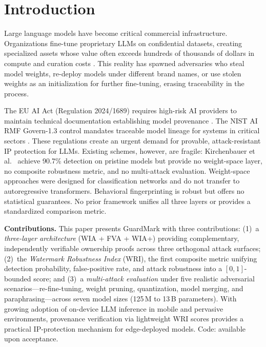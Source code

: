 \documentclass[conference]{IEEEtran}
\begin{document}
\section{Introduction}
\label{sec:intro}

Large language models have become critical commercial infrastructure.
Organizations fine-tune proprietary LLMs on confidential datasets, creating
specialized assets whose value often exceeds hundreds of thousands of dollars
in compute and curation costs \cite{brown2020language,ouyang2022training}.
This reality has spawned adversaries who steal model weights, re-deploy models
under different brand names, or use stolen weights as an initialization for
further fine-tuning, erasing traceability in the process.

The EU AI Act (Regulation 2024/1689) requires high-risk AI providers to
maintain technical documentation establishing model provenance
\cite{eu2024aiact}. The NIST AI RMF Govern-1.3 control mandates traceable
model lineage for systems in critical sectors \cite{nist2023ai}.
These regulations create an urgent demand for provable, attack-resistant IP
protection for LLMs. Existing schemes, however, are fragile: Kirchenbauer
et al.~\cite{kirchenbauer2023watermark} achieve 90.7\% detection on pristine
models but provide no weight-space layer, no composite robustness metric, and
no multi-attack evaluation. Weight-space approaches
\cite{uchida2017embedding,zhang2018protecting} were designed for classification
networks and do not transfer to autoregressive transformers. Behavioral
fingerprinting \cite{cao2021ipguard} is robust but offers no statistical
guarantees. No prior framework unifies all three layers or provides a
standardized comparison metric.

\textbf{Contributions.} This paper presents GuardMark with three contributions:
(1)~a \emph{three-layer architecture} (WIA + FVA + WIA+) providing
complementary, independently verifiable ownership proofs across three
orthogonal attack surfaces;
(2)~the \emph{Watermark Robustness Index} (WRI), the first composite metric
unifying detection probability, false-positive rate, and attack robustness
into a $[0,1]$-bounded score; and
(3)~a \emph{multi-attack evaluation} under five realistic adversarial
scenarios---re-fine-tuning, weight pruning, quantization, model merging, and
paraphrasing---across seven model sizes (125\,M to 13\,B parameters).
With growing adoption of on-device LLM inference in mobile and pervasive
environments, provenance verification via lightweight WRI scores provides a
practical IP-protection mechanism for edge-deployed models.
Code: available upon acceptance.
\end{document}
